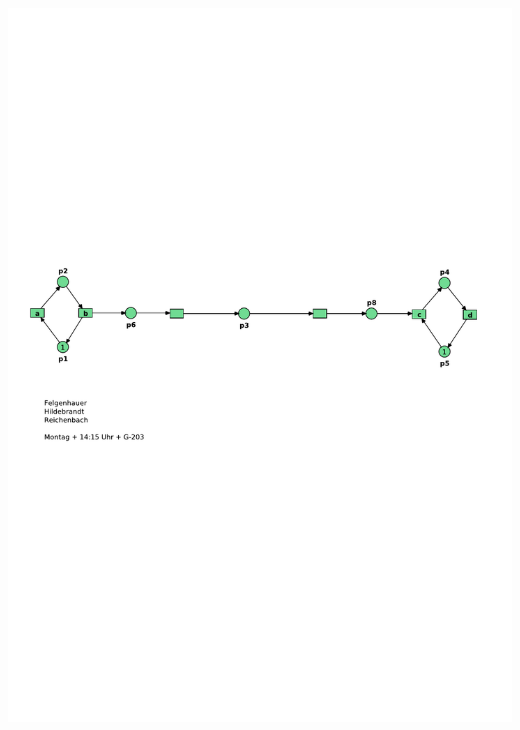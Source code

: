 \documentclass[12pt,a4paper]{../krautsourcing/homework}
\begin{document}
\subsection{}
\includegraphics[scale=0.8,trim={5mm 140mm 10mm 105mm},clip]{Aufgabe_6-4/Aufgabe_6-4-2.pdf}
\end{document}

